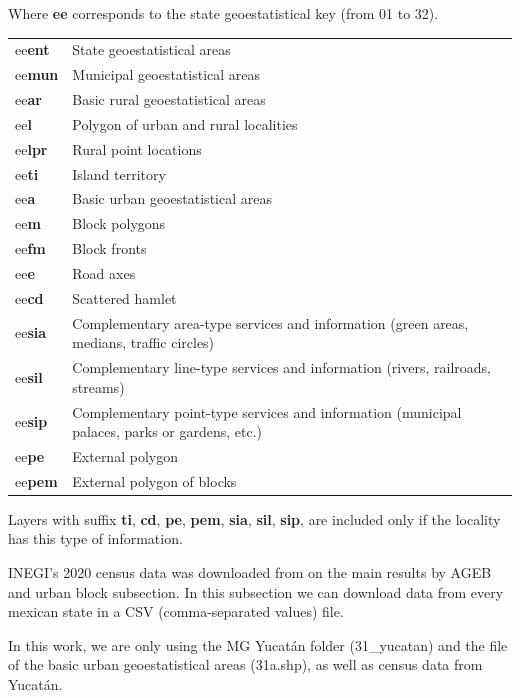 Where \textbf{ee} corresponds to the state geoestatistical key (from 01 to 32).

\begin{table}[h!]
	\centering
	\label{tab:MG_filenames}
	\footnotesize
	\begin{tabular}{ l l }
		ee\textbf{ent} & State geoestatistical areas \\
		ee\textbf{mun} & Municipal geoestatistical areas \\
		ee\textbf{ar} & Basic rural geoestatistical areas \\
		ee\textbf{l} & Polygon of urban and rural localities \\
		ee\textbf{lpr} & Rural point locations \\
		ee\textbf{ti} & Island territory\\
		ee\textbf{a} & Basic urban geoestatistical areas \\
		ee\textbf{m} & Block polygons\\
		ee\textbf{fm} & Block fronts \\
		ee\textbf{e} & Road axes \\
		ee\textbf{cd} & Scattered hamlet \\
		ee\textbf{sia} & Complementary area-type services and information (green areas, medians, traffic circles) \\
		ee\textbf{sil} & Complementary line-type services and information
		(rivers, railroads, streams) \\
		ee\textbf{sip} & Complementary point-type services and information
		(municipal palaces, parks or gardens, etc.) \\
		ee\textbf{pe} & External polygon \\
		ee\textbf{pem} & External polygon of blocks \\
	\end{tabular}
\end{table}

Layers with suffix \textbf{ti}, \textbf{cd}, \textbf{pe}, \textbf{pem}, \textbf{sia}, \textbf{sil}, \textbf{sip}, are included only if the locality has this type of information.

INEGI's 2020 census data was downloaded from \cite{2020census} on the main results by AGEB and urban block subsection. In this subsection we can download data from every mexican state in a CSV (comma-separated values) file.

In this work, we are only using the MG Yucatán folder (31\_yucatan) and the file of the basic urban geoestatistical areas (31a.shp), as well as census data from Yucatán.


